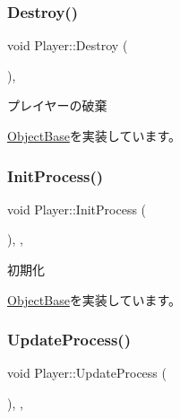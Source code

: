 \mbox{\label{class_player_af2cf4936165ef12cce96f7994e0879df}} 
\subsubsection{\texorpdfstring{Destroy()}{Destroy()}}
{\footnotesize\ttfamily void Player\+::\+Destroy (\begin{DoxyParamCaption}{ }\end{DoxyParamCaption})\hspace{0.3cm}{\ttfamily [final]}, {\ttfamily [virtual]}}



プレイヤーの破棄 



\mbox{\hyperlink{class_object_base_a7fa4c548153c3af20f89673ffea809af}{Object\+Base}}を実装しています。

\mbox{\label{class_player_a1051f85c8bf18a256d275d1a1dee5da6}} 
\subsubsection{\texorpdfstring{Init\+Process()}{InitProcess()}}
{\footnotesize\ttfamily void Player\+::\+Init\+Process (\begin{DoxyParamCaption}{ }\end{DoxyParamCaption})\hspace{0.3cm}{\ttfamily [final]}, {\ttfamily [protected]}, {\ttfamily [virtual]}}



初期化 



\mbox{\hyperlink{class_object_base_af133f36f2bca1dcfd962e2cfac61ab51}{Object\+Base}}を実装しています。

\mbox{\label{class_player_ab8accc9b83b030f5313f1b4872a7e634}} 
\subsubsection{\texorpdfstring{Update\+Process()}{UpdateProcess()}}
{\footnotesize\ttfamily void Player\+::\+Update\+Process (\begin{DoxyParamCaption}{ }\end{DoxyParamCaption})\hspace{0.3cm}{\ttfamily [final]}, {\ttfamily [protected]}, {\ttfamily [virtual]}}



